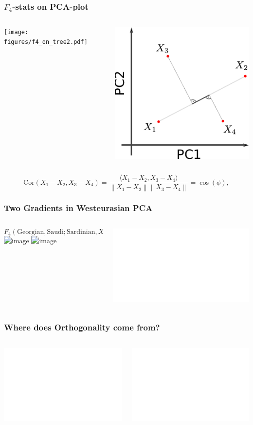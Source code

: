 \documentclass[11pt]{beamer}
\newcommand{\norm}[1]{\left\lVert#1\right\rVert}
\begin{document}
\begin{frame}
	\frametitle{ $F_4$-stats on PCA-plot}
	\begin{columns}
		\begin{column}{0.5\textwidth}
			\texttt{[image: figures/f4\_on\_tree2.pdf]}
		\end{column}
		\begin{column}{0.5\textwidth}	
			\includegraphics{figures/f4_on_pca.pdf}	
		\end{column}
	\end{columns}
\begin{equation*}
\text{Cor}(X_1 - X_2, X_3 - X_4) =  \frac{\langle X_1 - X_2, X_3 - X_4 \rangle}{\norm{X_1-X_2}\norm{X_3-X_4}} = \cos(\phi),\label{eq:angle}
\end{equation*}
\end{frame}

\begin{frame}
	\frametitle{Two Gradients in Westeurasian PCA}
\begin{columns}
	\begin{column}{.7\textwidth}
		$$F_4(\text{Georgian}, \text{Saudi}; \text{Sardinian}, X)$$
\includegraphics<1-2>[width=\textwidth]{data/figures/talk/anglepca.png}
\includegraphics<3>[width=\textwidth]{data/figures/talk/anglepca13.png}
	\end{column}
	\begin{column}{.4\textwidth}
	\includegraphics<2->[width=\textwidth]{data/figures/talk/angle.pdf}
\end{column}
\end{columns}
\end{frame}




\begin{frame}
\frametitle{Where does Orthogonality come from?}
\begin{columns}
	\begin{column}{0.5\textwidth}
		\includegraphics<1->{figures/f3_nonorthogonal.pdf}
	\end{column}
	\begin{column}{0.5\textwidth}
		\includegraphics<2>{figures/f3_orthogonal.pdf}
	\end{column}
\end{columns}
\end{frame}
\end{document}
